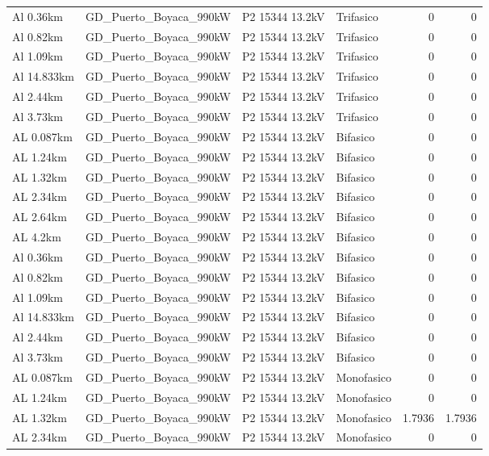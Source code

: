 \documentclass[11pt,a4paper]{article}
\begin{document}
\begin{longtable}{llllrr}
Al 0.36km & GD\_Puerto\_Boyaca\_990kW & P2 15344 13.2kV & Trifasico & 0 & 0 \\
Al 0.82km & GD\_Puerto\_Boyaca\_990kW & P2 15344 13.2kV & Trifasico & 0 & 0 \\
Al 1.09km & GD\_Puerto\_Boyaca\_990kW & P2 15344 13.2kV & Trifasico & 0 & 0 \\
Al 14.833km & GD\_Puerto\_Boyaca\_990kW & P2 15344 13.2kV & Trifasico & 0 & 0 \\
Al 2.44km & GD\_Puerto\_Boyaca\_990kW & P2 15344 13.2kV & Trifasico & 0 & 0 \\
Al 3.73km & GD\_Puerto\_Boyaca\_990kW & P2 15344 13.2kV & Trifasico & 0 & 0 \\
AL 0.087km & GD\_Puerto\_Boyaca\_990kW & P2 15344 13.2kV & Bifasico & 0 & 0 \\
AL 1.24km & GD\_Puerto\_Boyaca\_990kW & P2 15344 13.2kV & Bifasico & 0 & 0 \\
AL 1.32km & GD\_Puerto\_Boyaca\_990kW & P2 15344 13.2kV & Bifasico & 0 & 0 \\
AL 2.34km & GD\_Puerto\_Boyaca\_990kW & P2 15344 13.2kV & Bifasico & 0 & 0 \\
AL 2.64km & GD\_Puerto\_Boyaca\_990kW & P2 15344 13.2kV & Bifasico & 0 & 0 \\
AL 4.2km & GD\_Puerto\_Boyaca\_990kW & P2 15344 13.2kV & Bifasico & 0 & 0 \\
Al 0.36km & GD\_Puerto\_Boyaca\_990kW & P2 15344 13.2kV & Bifasico & 0 & 0 \\
Al 0.82km & GD\_Puerto\_Boyaca\_990kW & P2 15344 13.2kV & Bifasico & 0 & 0 \\
Al 1.09km & GD\_Puerto\_Boyaca\_990kW & P2 15344 13.2kV & Bifasico & 0 & 0 \\
Al 14.833km & GD\_Puerto\_Boyaca\_990kW & P2 15344 13.2kV & Bifasico & 0 & 0 \\
Al 2.44km & GD\_Puerto\_Boyaca\_990kW & P2 15344 13.2kV & Bifasico & 0 & 0 \\
Al 3.73km & GD\_Puerto\_Boyaca\_990kW & P2 15344 13.2kV & Bifasico & 0 & 0 \\
AL 0.087km & GD\_Puerto\_Boyaca\_990kW & P2 15344 13.2kV & Monofasico & 0 & 0 \\
AL 1.24km & GD\_Puerto\_Boyaca\_990kW & P2 15344 13.2kV & Monofasico & 0 & 0 \\
AL 1.32km & GD\_Puerto\_Boyaca\_990kW & P2 15344 13.2kV & Monofasico & 1.7936 & 1.7936 \\
AL 2.34km & GD\_Puerto\_Boyaca\_990kW & P2 15344 13.2kV & Monofasico & 0 & 0 \\

\end{longtable}
\end{document}
